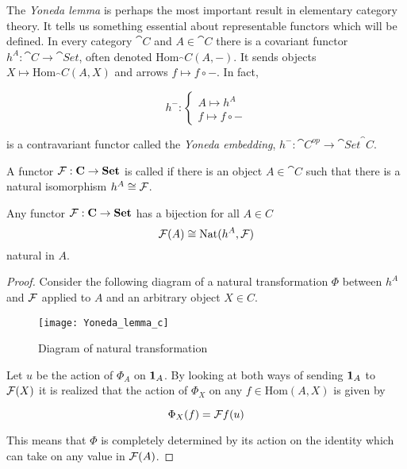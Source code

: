 \documentclass[../../main.tex]{subfiles}
\begin{document}
    The \emph{Yoneda lemma} is perhaps the most important result in elementary category theory. It tells us something essential about representable functors which will be defined. In every category $\cat{C}$ and $A \in \cat{C}$ there is a covariant functor $h^A: \cat{C} \to \cat{Set}$, often denoted $\mathrm{Hom}_\cat{C}(A, -)$. It sends objects $X \mapsto \mathrm{Hom}_\cat{C}(A, X)$ and arrows $f \mapsto f \circ -$. In fact, 
    
    \begin{equation*}
        h^-: 
        \begin{cases}
            A \mapsto h^A \\
            f \mapsto f \circ -
        \end{cases}
    \end{equation*}
    
    is a contravariant functor called the \emph{Yoneda embedding}, $h^-: \cat{C}^{op} \to \cat{Set}^\cat{C}$.
    
    \begin{definition}
        A functor $\functor{F}: \cat{C} \to \cat{Set}$ is called  if there is an object $A \in \cat{C}$ such that there is a natural isomorphism $h^A \cong \functor{F}$.
    \end{definition}
    
    \begin{theorem}
        Any functor $\functor{F}: \cat{C} \to \cat{Set}$ has a bijection for all $A \in C$ 
        $$\functor{F}(A) \cong \mathrm{Nat}(h^A, \functor{F})$$ 
        natural in $A$.
    \end{theorem}
    
    \begin{proof}
        Consider the following diagram of a natural transformation $\Phi$ between $h^A$ and $\functor{F}$ applied to $A$ and an arbitrary object $X \in C$. 
        
        \begin{figure}[H]
            \centering
            \texttt{[image: Yoneda\_lemma\_c]}
            \caption{Diagram of natural transformation}
            \label{fig:boat1}
        \end{figure}

        Let $u$ be the action of $\Phi_A$ on $\idarrow[A]$. By looking at both ways of sending $\idarrow[A]$ to $\functor{F}(X)$ it is realized that the action of $\Phi_X$ on any $f \in \mathrm{Hom}(A, X)$ is given by 

        \begin{equation}
            \Phi_X(f) = \functor{F}f(u)
        \end{equation}
        
        This means that $\Phi$ is completely determined by its action on the identity which can take on any value in $\functor{F}(A)$.
    \end{proof}
\end{document}
